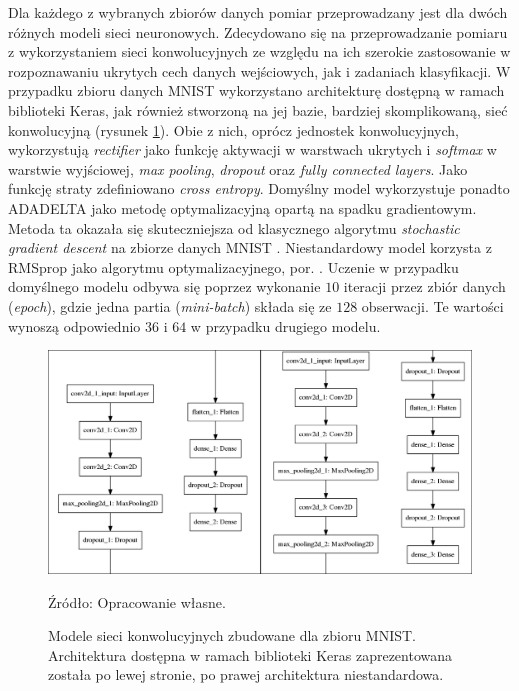 \documentclass[12pt,a4paper,twoside]{article}
\newcommand{\source}[1]{\caption*{\hfill Źródło: {#1}} }
\begin{document}
Dla każdego z wybranych zbiorów danych pomiar przeprowadzany jest dla dwóch różnych modeli sieci neuronowych. Zdecydowano się na przeprowadzanie pomiaru z wykorzystaniem sieci konwolucyjnych ze względu na ich szerokie zastosowanie w rozpoznawaniu ukrytych cech danych wejściowych, jak i zadaniach klasyfikacji. W przypadku zbioru danych MNIST wykorzystano architekturę dostępną w ramach biblioteki Keras, jak również stworzoną na jej bazie, bardziej skomplikowaną, sieć konwolucyjną (rysunek \ref{fig:mnist_cnn}). Obie z nich, oprócz jednostek konwolucyjnych, wykorzystują \textit{rectifier} jako funkcję aktywacji w warstwach ukrytych i \textit{softmax} w warstwie wyjściowej, \textit{max pooling}, \textit{dropout} oraz \textit{fully connected layers}. Jako funkcję straty zdefiniowano \textit{cross entropy}. Domyślny model wykorzystuje ponadto ADADELTA jako metodę optymalizacyjną opartą na spadku gradientowym. Metoda ta okazała się skuteczniejsza od klasycznego algorytmu \textit{stochastic gradient descent}
na zbiorze danych MNIST \citep{zeiler2012}. Niestandardowy model korzysta z RMSprop jako algorytmu optymalizacyjnego, por. \citet{tieleman2012}. Uczenie w przypadku domyślnego modelu odbywa się poprzez wykonanie $10$ iteracji przez zbiór danych (\textit{epoch}), gdzie jedna partia (\textit{mini-batch}) składa się ze $128$ obserwacji. Te wartości wynoszą odpowiednio $36$ i $64$ w przypadku drugiego modelu.
\begin{figure}[h]
  \centering
\includegraphics[scale=0.35]{../obrazy/fig:mnist_cnn.png}
\caption{Modele sieci konwolucyjnych zbudowane dla zbioru MNIST. Architektura dostępna w ramach biblioteki Keras zaprezentowana została po lewej stronie, po prawej architektura niestandardowa.\label{fig:mnist_cnn}}
\source{Opracowanie własne.}
\end{figure}
\end{document}

